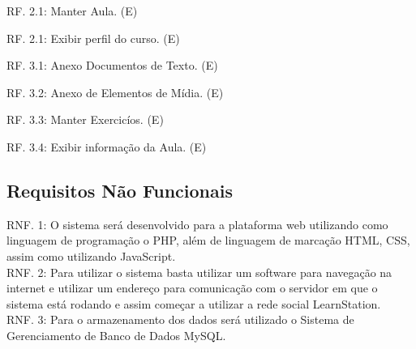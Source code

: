 \documentclass[12pt,a4paper,onecolumn,titlepage]{article}
\begin{document}
RF. 2.1: Manter Aula. (E)

RF. 2.1: Exibir perfil do curso. (E)



RF. 3.1: Anexo Documentos de Texto. (E)

RF. 3.2: Anexo de Elementos de Mídia. (E)

RF. 3.3: Manter Exercicíos. (E)

RF. 3.4: Exibir informação da Aula. (E)


\subsection{Requisitos Não Funcionais}



RNF. 1: O sistema será desenvolvido para a plataforma web utilizando como linguagem de programação o PHP, além de linguagem de marcação HTML, CSS, assim como utilizando JavaScript.\\

RNF. 2: Para utilizar o sistema basta utilizar um software para navegação na internet e utilizar um endereço para comunicação com o servidor em que o sistema está rodando e assim começar a utilizar a rede social LearnStation.\\

RNF. 3: Para o armazenamento dos dados será utilizado o Sistema de Gerenciamento de Banco de Dados MySQL.\\



\end{document}
